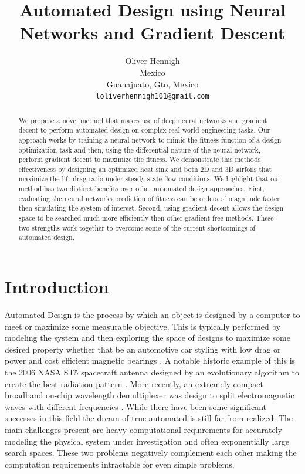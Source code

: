 \documentclass{article} %
\title{Automated Design using Neural Networks and Gradient Descent}
\author{Oliver Hennigh \\
Mexico\\
Guanajuato, Gto, Mexico \\
\texttt{loliverhennigh101@gmail.com} \\
}
\begin{document}
\maketitle

\begin{abstract}

We propose a novel method that makes use of deep neural networks and gradient decent to perform automated design on complex real world engineering tasks. Our approach works by training a neural network to mimic the fitness function of a design optimization task and then, using the differential nature of the neural network, perform gradient decent to maximize the fitness. We demonstrate this methods effectiveness by designing an optimized heat sink and both 2D and 3D airfoils that maximize the lift drag ratio under steady state flow conditions. We highlight that our method has two distinct benefits over other automated design approaches. First, evaluating the neural networks prediction of fitness can be orders of magnitude faster then simulating the system of interest. Second, using gradient decent allows the design space to be searched much more efficiently then other gradient free methods. These two strengths work together to overcome some of the current shortcomings of automated design.

\end{abstract}

\section{Introduction}

Automated Design is the process by which an object is designed by a computer to meet or maximize some measurable objective. This is typically performed by modeling the system and then exploring the space of designs to maximize some desired property whether that be an automotive car styling with low drag or power and cost efficient magnetic bearings \citep{ando2010automotive} \citep{dyck1996automated} . A notable historic example of this is the 2006 NASA ST5 spacecraft antenna designed by an evolutionary algorithm to create the best radiation pattern \citep{hornbyautomated}. More recently, an extremely compact broadband on-chip wavelength demultiplexer was design to split electromagnetic waves with different frequencies \citep{piggott2015inverse}. While there have been some significant successes in this field the dream of true automated is still far from realized. The main challenges present are heavy computational requirements for accurately modeling the physical system under investigation and often exponentially large search spaces. These two problems negatively complement each other making the computation requirements intractable for even simple problems.
\end{document}
